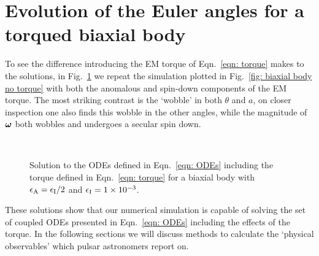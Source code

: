 \documentclass[../full_thesis/full_thesis.tex]{subfiles}
\begin{document}
\section{Evolution of the Euler angles for a torqued biaxial body}
To see the difference introducing the EM torque of Eqn.~\eqref{eqn: torque}  makes to the
solutions, in Fig.~\ref{fig: biaxial body with torque} we repeat the simulation
plotted in Fig.~\ref{fig: biaxial body no torque} with both the anomalous
and spin-down components of the EM torque. The most
striking contrast is the `wobble' in both $\theta$ and $a$, on closer
inspection one also finds this wobble in the other angles, while the magnitude of
$\boldsymbol{\omega}$ both wobbles and undergoes a secular spin down.
\begin{figure}[ht]
    \centering
{} \\
\caption{Solution to the ODEs defined in Eqn.~\eqref{eqn: ODEs} including the
torque defined in Eqn.~\eqref{eqn: torque} for a biaxial body with
$\epsilon_{\mathrm{A}}=\epsilon_{\mathrm{I}}/2$ and $\epsilon_{\mathrm{I}}=1\times10^{-3}$.}
\label{fig: biaxial body with torque}
\end{figure}

These solutions show that our numerical simulation is capable of solving the
set of coupled ODEs presented in Eqn.~\eqref{eqn: ODEs} including the effects
of the torque. In the following sections we will discuss methods to calculate
the `physical observables' which pulsar astronomers report on.
\end{document}
